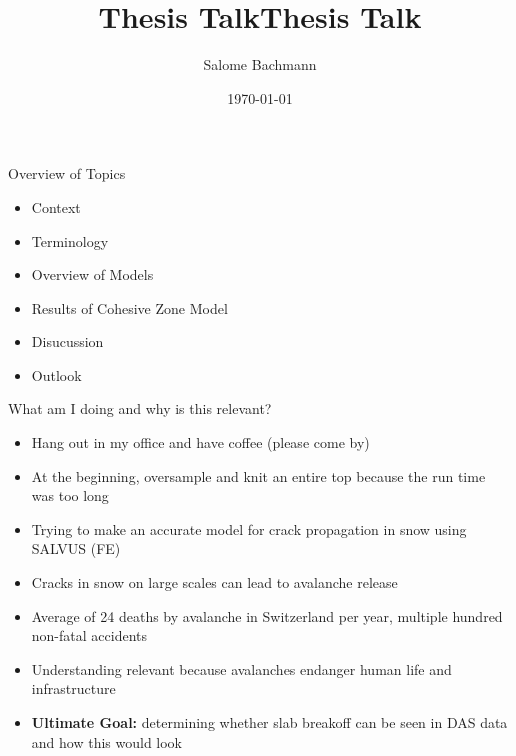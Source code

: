 \documentclass[11pt,aspectratio=169]{beamer}
\title{Thesis Talk}
\date[]{\today}
\author{Salome Bachmann}
\institute{}
\begin{document}


\def\titlefigure{elements/mountains.jpeg}
\def\titlefigureangle{180}
\def\titlefiguremirror{-1}
\def\showtitlelogo{0}
\title{Thesis Talk}
\titleframe




\begin{frame}{Overview of Topics}
    \begin{itemize}
        \item Context
        \item Terminology
        \item Overview of Models
        \item Results of Cohesive Zone Model
        \item Disucussion
        \item Outlook
    \end{itemize}
    
\end{frame}


\begin{frame}{What am I doing and why is this relevant?}
    \begin{itemize}
        \item Hang out in my office and have coffee (please come by)
        \item At the beginning, oversample and knit an entire top because the run time was too long
        \item Trying to make an accurate model for crack propagation in snow using SALVUS (FE)
        \item Cracks in snow on large scales can lead to avalanche release
        \item Average of 24 deaths by avalanche in Switzerland per year, multiple hundred non-fatal accidents \parencite{LongtermStatistics} 
        \item Understanding relevant because avalanches endanger human life and infrastructure \parencite{schweizerSnowAvalancheFormation2003}
        \item \textbf{Ultimate Goal:} determining whether slab breakoff can be seen in DAS data and how this would look
    \end{itemize}
\end{frame}
\end{document}
